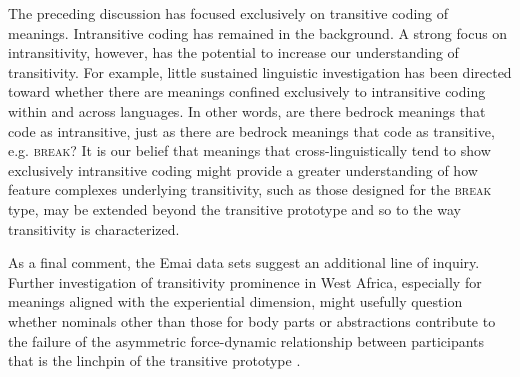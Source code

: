 \documentclass[output=paper,colorlinks,citecolor=brown
]{langscibook}
\begin{document}
The preceding discussion has focused exclusively on transitive coding of meanings. Intransitive coding has remained in the background. A strong focus on intransitivity, however, has the potential to increase our understanding of transitivity. For example, little sustained linguistic investigation has been directed toward whether there are meanings confined exclusively to intransitive coding within and across languages. In other words, are there bedrock meanings that code as intransitive, just as there are bedrock meanings that code as transitive, e.g. \textsc{break}? It is our belief that meanings that cross-linguistically tend to show exclusively intransitive coding might provide a greater understanding of how feature complexes underlying transitivity, such as those designed for the \textsc{break} type, may be extended beyond the transitive prototype and so to the way transitivity is characterized.  

As a final comment, the Emai data sets suggest an additional line of inquiry. Further investigation of transitivity prominence in West Africa, especially for meanings aligned with the experiential dimension, might usefully question whether nominals other than those for body parts or abstractions contribute to the failure of the asymmetric force-dynamic relationship between participants that is the linchpin of the transitive prototype \citep{Rice1987}.  
\end{document}
